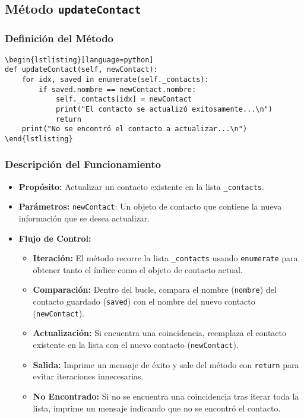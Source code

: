 \subsection{Método \texttt{updateContact}}
\subsubsection{Definición del Método}
\begin{verbatim}
\begin{lstlisting}[language=python]
def updateContact(self, newContact):
    for idx, saved in enumerate(self._contacts):
        if saved.nombre == newContact.nombre:
            self._contacts[idx] = newContact
            print("El contacto se actualizó exitosamente...\n")
            return
    print("No se encontró el contacto a actualizar...\n")
\end{lstlisting}
\end{verbatim}

\subsubsection{Descripción del Funcionamiento}
\begin{itemize}
    \item \textbf{Propósito:}
    Actualizar un contacto existente en la lista \texttt{\_contacts}.
    \item \textbf{Parámetros:}
    \texttt{newContact}: Un objeto de contacto que contiene la nueva información que se desea actualizar.
    \item \textbf{Flujo de Control:}
    \begin{itemize}
        \item \textbf{Iteración:} El método recorre la lista \texttt{\_contacts} usando \texttt{enumerate} para obtener tanto el índice como el objeto de contacto actual.
        \item \textbf{Comparación:} Dentro del bucle, compara el nombre (\texttt{nombre}) del contacto guardado (\texttt{saved}) con el nombre del nuevo contacto (\texttt{newContact}).
        \item \textbf{Actualización:} Si encuentra una coincidencia, reemplaza el contacto existente en la lista con el nuevo contacto (\texttt{newContact}).
        \item \textbf{Salida:} Imprime un mensaje de éxito y sale del método con \texttt{return} para evitar iteraciones innecesarias.
        \item \textbf{No Encontrado:} Si no se encuentra una coincidencia tras iterar toda la lista, imprime un mensaje indicando que no se encontró el contacto.
    \end{itemize}
\end{itemize}

